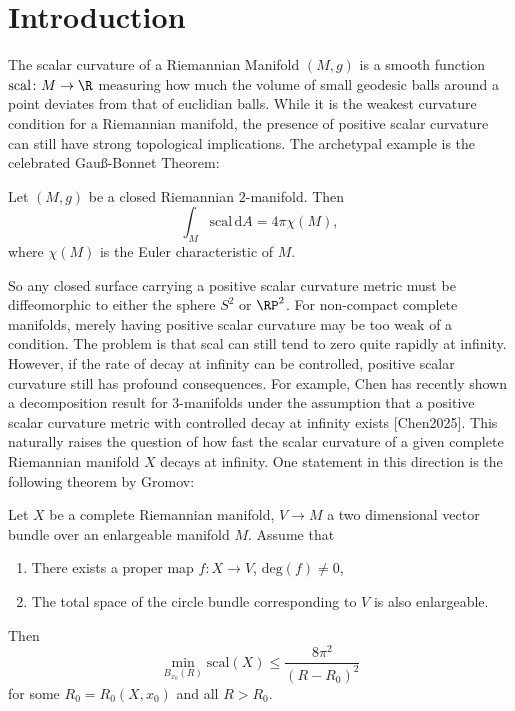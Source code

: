 \section*{Introduction}

The scalar curvature of a Riemannian Manifold $(M,g)$ is a smooth function $\mathrm{scal} \colon M \to \R$ measuring how much the volume of small geodesic balls around a point deviates from that of euclidian balls. While it is the weakest curvature condition for a Riemannian manifold, the presence of positive scalar curvature can still have strong topological implications. The archetypal example is the celebrated Gauß-Bonnet Theorem:

\begin{theorem*}
    Let $(M,g)$ be a closed Riemannian $2$-manifold. Then 
    \[
    \int_M \mathrm{scal} \, \mathrm{d}A = 4\pi\chi(M),
    \]
    where $\chi(M)$ is the Euler characteristic of $M$.
\end{theorem*}

So any closed surface carrying a positive scalar curvature metric must be diffeomorphic to either the sphere $S^2$ or $\RP^2$. For non-compact complete manifolds, merely having positive scalar curvature may be too weak of a condition. The problem is that scal can still tend to zero quite rapidly at infinity. However, if the rate of decay at infinity can be controlled, positive scalar curvature still has profound consequences. For example, Chen has recently shown a decomposition result for $3$-manifolds under the assumption that a positive scalar curvature metric with controlled decay at infinity exists [Chen2025]. This naturally raises the question of how fast the scalar curvature of a given complete Riemannian manifold $X$ decays at infinity. One statement in this direction is the following theorem by Gromov:

\begin{theorem*}
    \label{intro:thm:gromov_thm}
Let $X$ be a complete Riemannian manifold, $V \to M$ a two dimensional vector bundle over an enlargeable manifold $M$. Assume that 
\begin{enumerate}[label=(\roman*)]
    \item There exists a proper map $f \colon X \to V$, $\mathrm{deg}(f) \neq 0$,
    \item \label{intro:eq:gromov_thm_condition_2}The total space of the circle bundle corresponding to $V$ is also enlargeable.
\end{enumerate}
Then 
\[
\min_{B_{x_0}(R)} \mathrm{scal}(X) \leq \frac{8 \pi^2}{(R-R_0)^2}
\]
for some $R_0 = R_0(X,x_0)$ and all $R > R_0$.
\end{theorem*}

